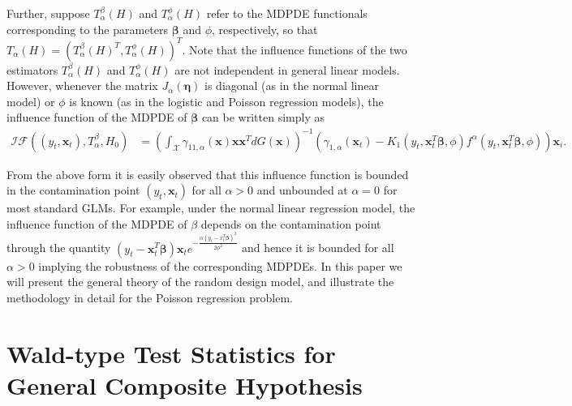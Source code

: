 \documentclass[a4paper]{article}%
\begin{document}
Further, suppose $T_{\alpha}^{\beta}(H)$ and $T_{\alpha}^{\phi}(H)$ refer to
the MDPDE functionals corresponding to the parameters $\boldsymbol{\beta}$ and
$\phi$, respectively, so that $T_{\alpha}(H)= (T_{\alpha}^{\beta}(H)^{T},
T_{\alpha}^{\phi}(H))^{T}$. Note that the influence functions of the two
estimators $T_{\alpha}^{\beta}(H)$ and $T_{\alpha}^{\phi}(H)$ are not
independent in general linear models. However, whenever the matrix $J_{\alpha
}(\boldsymbol{\eta})$ is diagonal (as in the normal linear model) or $\phi$ is
known (as in the logistic and Poisson regression models), the influence function of
the MDPDE of $\boldsymbol{\beta}$ can be written simply as
\begin{align}
\mathcal{IF}((y_{t},\boldsymbol{x}_{t}),T_{\alpha}^{\beta},H_{0})  &  =
\left(  {\int_{\mathcal{X}}}\gamma_{11,\alpha}(\boldsymbol{x} )\boldsymbol{x}%
\boldsymbol{x}^{T}dG(\boldsymbol{x})\right)  ^{-1} \left(  \gamma_{1,\alpha
}(\boldsymbol{x}_{t})- K_{1}(y_{t},\boldsymbol{x}_{t}^{T}\boldsymbol{\beta
},\phi)f^{\alpha}(y_{t},\boldsymbol{x}_{t}^{T}\boldsymbol{\beta},\phi)\right)
\boldsymbol{x}_{i}.
\end{align}


From the above form it is easily observed that this  influence function  is
bounded in the contamination point $(y_{t},\boldsymbol{x}_{t})$ for all $\alpha>0$
and unbounded at $\alpha=0$ for most standard GLMs. For example, under the
 normal linear regression model, the influence function of the MDPDE of
$\beta$ depends on the contamination point through the quantity $(y_{t}%
-\boldsymbol{x}_{t}^{T}\boldsymbol{\beta})\boldsymbol{x}_{t}e^{-\frac
{\alpha(y_{t}-x_{t}^{T}\boldsymbol{\beta})^{2}}{2\phi^{2}}}$ and hence it is
bounded for all $\alpha>0$ implying the robustness of the corresponding MDPDEs. 
In this paper we will present the general theory of the random design model, 
and illustrate the methodology in detail for the Poisson regression problem. 



\section{Wald-type Test Statistics for General Composite Hypothesis
\label{sec3}}
\end{document}
